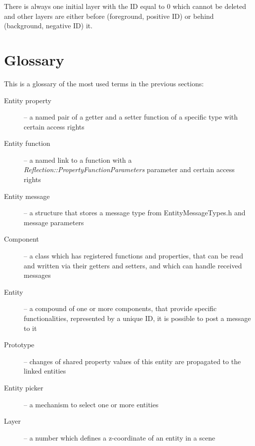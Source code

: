 \documentclass[a4paper, 12pt]{report}
\begin{document}
There is always one initial layer with the ID equal to 0 which cannot be deleted and other layers are either before (foreground, positive ID) or behind (background, negative ID) it.

\section{Glossary}

This is a glossary of the most used terms in the previous sections:

\begin{description}
  \item[Entity property] -- a named pair of a getter and a setter function of a specific type with certain access rights
  \item[Entity function] -- a named link to a function with a \emph{Reflection::Property\-FunctionParameters} parameter and certain access rights
  \item[Entity message] -- a structure that stores a message type from EntityMessageTypes.h and message parameters
  \item[Component] -- a class which has registered functions and properties, that can be read and written via their getters and setters, and which can handle received messages
  \item[Entity] -- a compound of one or more components, that provide specific functionalities, represented by a unique ID, it is possible to post a message to it
  \item[Prototype] -- changes of shared property values of this entity are propagated to the linked entities
  \item[Entity picker] -- a mechanism to select one or more entities
  \item[Layer] -- a number which defines a z-coordinate of an entity in a scene
\end{description}

\end{document}
